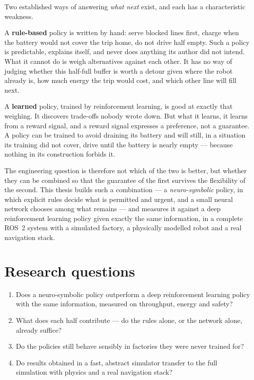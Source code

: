 Two established ways of answering \emph{what next} exist, and each has a characteristic weakness.

A \textbf{rule-based} policy is written by hand: serve blocked lines first, charge when the battery
would not cover the trip home, do not drive half empty. Such a policy is predictable, explains
itself, and never does anything its author did not intend. What it cannot do is weigh alternatives
against each other. It has no way of judging whether this half-full buffer is worth a detour given
where the robot already is, how much energy the trip would cost, and which other line will fill
next.

A \textbf{learned} policy, trained by reinforcement learning, is good at exactly that weighing. It
discovers trade-offs nobody wrote down. But what it learns, it learns from a reward signal, and a
reward signal expresses a preference, not a guarantee. A policy can be trained to avoid draining
its battery and will still, in a situation its training did not cover, drive until the battery is
nearly empty --- because nothing in its construction forbids it.

The engineering question is therefore not which of the two is better, but whether they can be
combined so that the guarantee of the first survives the flexibility of the second. This thesis
builds such a combination --- a \emph{neuro-symbolic} policy, in which explicit rules decide what
is permitted and urgent, and a small neural network chooses among what remains --- and measures it
against a deep reinforcement learning policy given exactly the same information, in a complete
ROS~2 system with a simulated factory, a physically modelled robot and a real navigation stack.

\section{Research questions}
\label{sec:research-questions}

\begin{enumerate}[label=\textbf{RQ\arabic*.}, leftmargin=*, itemsep=0.25em]
  \item Does a neuro-symbolic policy outperform a deep reinforcement learning policy with the same
        information, measured on throughput, energy and safety?
  \item What does each half contribute --- do the rules alone, or the network alone, already
        suffice?
  \item Do the policies still behave sensibly in factories they were never trained for?
  \item Do results obtained in a fast, abstract simulator transfer to the full simulation with
        physics and a real navigation stack?
\end{enumerate}

